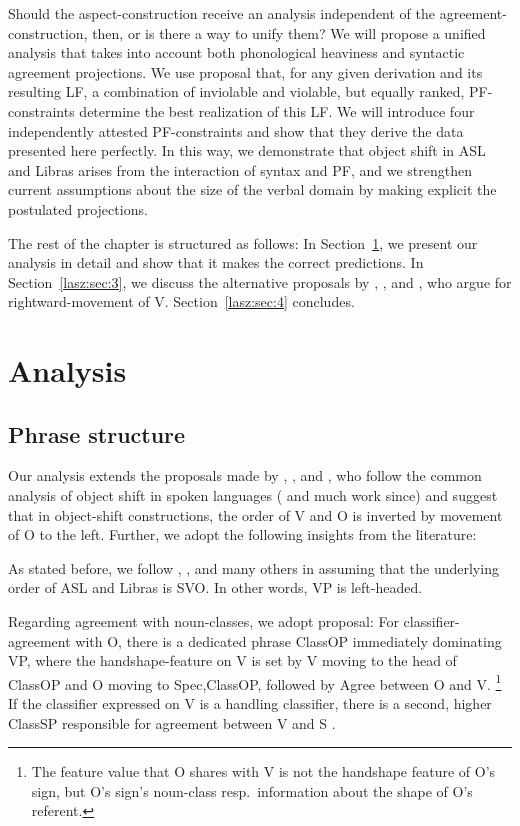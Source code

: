 \documentclass[output=paper]{langscibook}
\begin{document}
Should the aspect-construction receive an analysis independent
of the agree\-ment-con\-struc\-tion, then, or is there a way to unify them?
We will propose a unified analysis that takes into account both
phonological heaviness and syntactic agreement projections. We use
 proposal that, for any given
derivation and its resulting LF, a combination of inviolable and
violable, but equally ranked, PF-constraints determine the best
realization of this LF. We will introduce four independently attested
PF-constraints and show that they derive the data presented here
perfectly. In this way, we demonstrate that object shift in ASL and
Libras arises from the interaction of syntax and PF, and we strengthen
current assumptions about the size of the verbal domain by making
explicit the postulated projections.

The rest of the chapter is structured as follows: In Section~\ref{lasz:sec:2}, we
present our analysis in detail and show that it makes the correct
predictions. In Section~\ref{lasz:sec:3}, we discuss the alternative proposals by
\citet{Fischer.Janis.1992}, \citet{Matsuoka.1997}, and \citet{Braze.2004}, who
argue for rightward-movement of V. Section~\ref{lasz:sec:4} concludes.

\section{Analysis}
\label{lasz:sec:2}
    
\subsection{Phrase structure}
\label{lasz:sec:21}

Our analysis extends the proposals made by \citet{Quadros.etal.2004}, 
\citet{Quadros.DLM.2010}, and \citet{Gokgoz.2013}, who follow the
common analysis of object shift in spoken languages (\citealp{Holmberg:1986}
and much work since) and suggest that in object-shift constructions,
the order of V and O is inverted by movement of O to the left. Further,
we adopt the following insights from the literature:

As stated before, we follow \citet{Fischer.1975}, \citet{Liddell.1980},
\citet{Quadros.1999} and many others in assuming that the underlying order
of ASL and Libras is SVO. In other words, VP is left-headed.

Regarding agreement with noun-classes, we adopt 
proposal: For classifier-agreement with O, there is
a dedicated phrase ClassOP immediately dominating VP, where the
handshape-feature on V is set by V moving to the head of ClassOP and O
moving to Spec,ClassOP, followed by Agree between O and V.%
\footnote{
    The feature value that O shares with V is not the handshape feature of O’s
    sign, but O’s sign’s noun-class resp.~information about the shape of O’s referent.
}
If the
classifier expressed on V is a handling classifier, there is a second,
higher ClassSP responsible for agreement between V and S \citep{Benedicto.Brentari.2004}.
\end{document}
